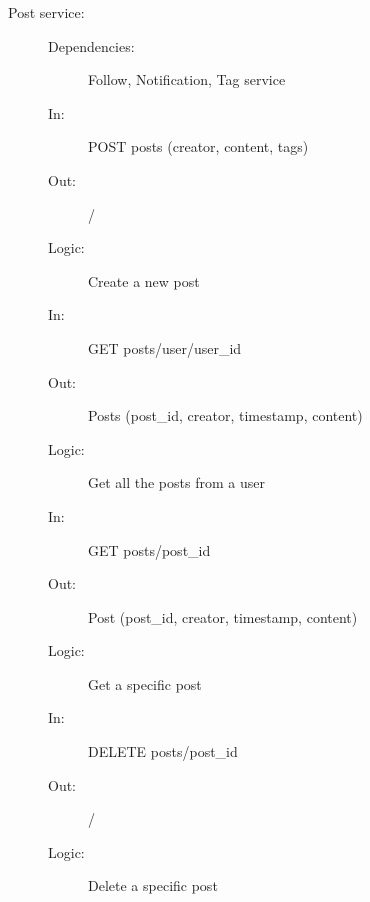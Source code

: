 \documentclass{article}
\begin{document}
\begin{description}
    \item [Post service:]
    \begin{description}
        \item[]
        \item[Dependencies:] Follow, Notification, Tag service
    \end{description}
    \begin{description}
        \item[]
        \item[In:] POST posts (creator, content, tags)
        \item[Out:] /
        \item[Logic:] Create a new post
        \item[]

        \item[In:] GET posts/user/user\_id
        \item[Out:] Posts (post\_id, creator, timestamp, content)
        \item[Logic:] Get all the posts from a user
        \item[]

        \item[In:] GET posts/post\_id
        \item[Out:] Post (post\_id, creator, timestamp, content)
        \item[Logic:] Get a specific post
        \item[]

        \item[In:] DELETE posts/post\_id
        \item[Out:] /
        \item[Logic:] Delete a specific post
    \end{description}
\end{description}
\end{document}
